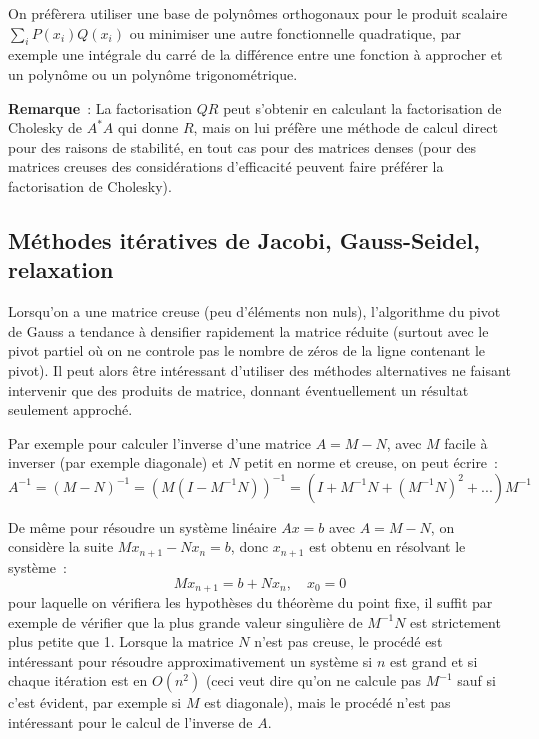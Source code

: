 \documentclass[a4paper,11pt]{book}
\begin{document}
\begin{giacjshere}
On pr\'ef\`erera utiliser une base de polyn\^omes orthogonaux pour
le produit scalaire $\sum_i P(x_i)Q(x_i)$
ou minimiser une autre fonctionnelle quadratique, par
exemple une int\'egrale du carr\'e de la diff\'erence entre une
fonction \`a approcher et un polyn\^ome ou un
polyn\^ome trigonom\'etrique.

{\bf Remarque}~: La factorisation $QR$ peut s'obtenir
en calculant la factorisation de Cholesky de $A^* A$ qui donne $R$,
mais on lui pr\'ef\`ere une m\'ethode de calcul direct pour des
raisons de stabilit\'e, en tout cas pour des matrices denses (pour des
matrices creuses des consid\'erations d'efficacit\'e peuvent faire
pr\'ef\'erer la factorisation de Cholesky).
 
\subsection{M\'ethodes it\'eratives de
Jacobi, Gauss-Seidel, relaxation} 
\label{sec:jacobi}
Lorsqu'on a une matrice creuse (peu d'\'el\'ements non nuls),
l'algorithme du pivot de Gauss a tendance \`a densifier rapidement
la matrice r\'eduite (surtout avec le pivot partiel o\`u on ne
controle pas le nombre de z\'eros de la ligne contenant le pivot). Il
peut alors \^etre int\'eressant d'utiliser des m\'ethodes alternatives
ne faisant intervenir que des produits de matrice, donnant \'eventuellement
un r\'esultat seulement approch\'e. 

Par exemple pour calculer
l'inverse d'une matrice $A=M-N$, avec $M$ facile \`a inverser (par
exemple diagonale) et 
$N$ petit en norme et creuse, on peut \'ecrire~:
$$ A^{-1}=(M-N)^{-1} =
(M(I-M^{-1}N))^{-1}=(I+M^{-1}N+(M^{-1}N)^2+...)M^{-1}$$

De m\^eme pour r\'esoudre un syst\`eme lin\'eaire $Ax=b$
avec $A=M-N$,
on consid\`ere la suite $Mx_{n+1}-Nx_n=b$, donc $x_{n+1}$ est obtenu
en r\'esolvant le syst\`eme~:
$$ Mx_{n+1}=b+N x_n, \quad x_0=0$$
pour laquelle on v\'erifiera les hypoth\`eses du th\'eor\`eme du point
fixe, il suffit par exemple de v\'erifier que la plus
grande valeur singuli\`ere de $M^{-1}N$ est strictement plus petite que 1.
Lorsque la matrice $N$ n'est pas creuse, le proc\'ed\'e est int\'eressant
pour r\'esoudre approximativement un syst\`eme si $n$ est grand
et si chaque it\'eration est en $O(n^2)$ (ceci veut
dire qu'on ne calcule pas $M^{-1}$ sauf si c'est
\'evident, par exemple si $M$ est diagonale), 
mais le proc\'ed\'e n'est pas int\'eressant pour le calcul de
l'inverse de $A$.
 

\end{giacjshere}
\end{document}
